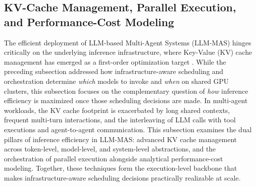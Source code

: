 \documentclass[11pt]{article}
\begin{document}
\subsection{KV-Cache Management, Parallel Execution, and Performance-Cost Modeling}

The efficient deployment of LLM-based Multi-Agent Systems (LLM-MAS) hinges critically on the underlying inference infrastructure, where Key-Value (KV) cache management has emerged as a first-order optimization target \cite{ref303,ref304}. While the preceding subsection addressed how infrastructure-aware scheduling and orchestration determine \emph{which} models to invoke and \emph{when} on shared GPU clusters, this subsection focuses on the complementary question of \emph{how} inference efficiency is maximized once those scheduling decisions are made. In multi-agent workloads, the KV cache footprint is exacerbated by long shared contexts, frequent multi-turn interactions, and the interleaving of LLM calls with tool executions and agent-to-agent communication. This subsection examines the dual pillars of inference efficiency in LLM-MAS: advanced KV cache management across token-level, model-level, and system-level abstractions, and the orchestration of parallel execution alongside analytical performance-cost modeling. Together, these techniques form the execution-level backbone that makes infrastructure-aware scheduling decisions practically realizable at scale.
\end{document}
